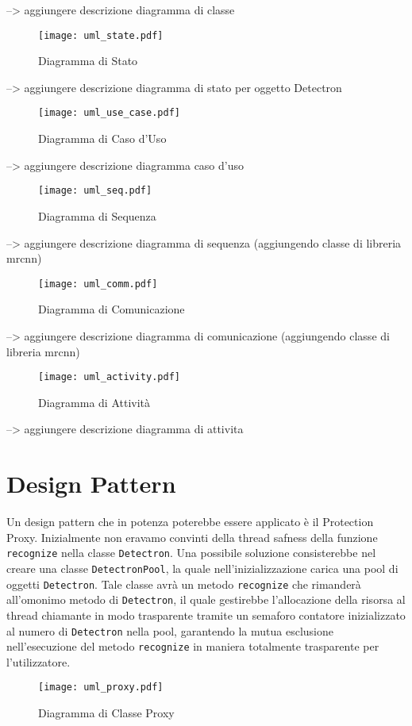 \documentclass[12pt,a4paper]{article}
\begin{document}
--> aggiungere descrizione diagramma di classe

\begin{figure}[p]
  \caption{Diagramma di Stato}
  \centering
  \texttt{[image: uml\_state.pdf]}
\end{figure}

--> aggiungere descrizione diagramma di stato per oggetto Detectron

\begin{figure}[p]
  \caption{Diagramma di Caso d'Uso}
  \centering
  \texttt{[image: uml\_use\_case.pdf]}
\end{figure}

--> aggiungere descrizione diagramma caso d'uso

\begin{figure}[p]
  \caption{Diagramma di Sequenza}
  \centering
  \texttt{[image: uml\_seq.pdf]}
\end{figure}

--> aggiungere descrizione diagramma di sequenza (aggiungendo classe di libreria mrcnn)

\begin{figure}[p]
  \caption{Diagramma di Comunicazione}
  \centering
  \texttt{[image: uml\_comm.pdf]}
\end{figure}

--> aggiungere descrizione diagramma di comunicazione (aggiungendo classe di libreria mrcnn)

\begin{figure}[p]
  \caption{Diagramma di Attività}
  \centering
  \texttt{[image: uml\_activity.pdf]}
\end{figure}

--> aggiungere descrizione diagramma di attivita

\pagebreak

\section{Design Pattern}

Un design pattern che in potenza poterebbe essere applicato è il
Protection Proxy. Inizialmente non eravamo convinti della thread safness
della funzione \texttt{recognize} nella classe \texttt{Detectron}. Una
possibile soluzione consisterebbe nel creare una classe
\texttt{DetectronPool}, la quale nell'inizializzazione carica una pool
di oggetti \texttt{Detectron}. Tale classe avrà un metodo
\texttt{recognize} che rimanderà all'omonimo metodo di
\texttt{Detectron}, il quale gestirebbe l'allocazione della risorsa al
thread chiamante in modo trasparente tramite un semaforo contatore
inizializzato al numero di \texttt{Detectron} nella pool, garantendo la
mutua esclusione nell'esecuzione del metodo \texttt{recognize} in
maniera totalmente trasparente per l'utilizzatore.

\begin{figure}[h]
  \caption{Diagramma di Classe Proxy}
  \centering
  \texttt{[image: uml\_proxy.pdf]}
\end{figure}
\end{document}
